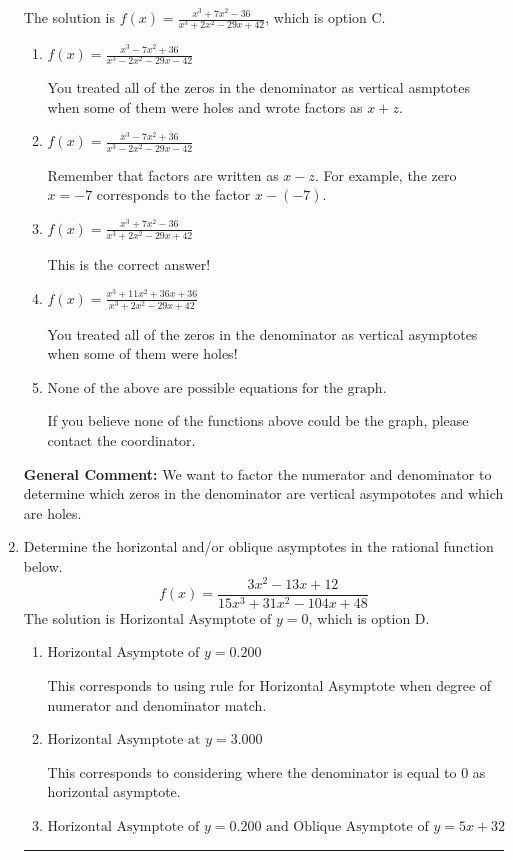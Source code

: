 \documentclass{extbook}[14pt]
\newcommand{\litem}[1]{\item #1

\rule{\textwidth}{0.4pt}}
\begin{document}
\begin{enumerate}
{The solution is \( f(x)=\frac{x^{3} +7 x^{2} -36}{x^{3} +2 x^{2} -29 x + 42} \), which is option C.\begin{enumerate}[label=\Alph*.]
\item \( f(x)=\frac{x^{3} -7 x^{2} + 36}{x^{3} -2 x^{2} -29 x -42} \)

You treated all of the zeros in the denominator as vertical asmptotes when some of them were holes and wrote factors as $x+z$.
\item \( f(x)=\frac{x^{3} -7 x^{2} + 36}{x^{3} -2 x^{2} -29 x -42} \)

Remember that factors are written as $x-z$. For example, the zero $x=-7$ corresponds to the factor $x-(-7)$.
\item \( f(x)=\frac{x^{3} +7 x^{2} -36}{x^{3} +2 x^{2} -29 x + 42} \)

This is the correct answer!
\item \( f(x)=\frac{x^{3} +11 x^{2} +36 x + 36}{x^{3} +2 x^{2} -29 x + 42} \)

You treated all of the zeros in the denominator as vertical asymptotes when some of them were holes!
\item \( \text{None of the above are possible equations for the graph.} \)

If you believe none of the functions above could be the graph, please contact the coordinator.
\end{enumerate}

\textbf{General Comment:} We want to factor the numerator and denominator to determine which zeros in the denominator are vertical asympototes and which are holes.
}
\litem{
Determine the horizontal and/or oblique asymptotes in the rational function below.
\[ f(x) = \frac{3x^{2} -13 x + 12}{15x^{3} +31 x^{2} -104 x + 48} \]The solution is \( \text{Horizontal Asymptote of } y = 0 \), which is option D.\begin{enumerate}[label=\Alph*.]
\item \( \text{Horizontal Asymptote of } y = 0.200  \)

This corresponds to using rule for Horizontal Asymptote when degree of numerator and denominator match.
\item \( \text{Horizontal Asymptote at } y = 3.000 \)

This corresponds to considering where the denominator is equal to 0 as horizontal asymptote.
\item \( \text{Horizontal Asymptote of } y = 0.200 \text{ and Oblique Asymptote of } y = 5x + 32 \)


\end{enumerate}}
\end{enumerate}
\end{document}
